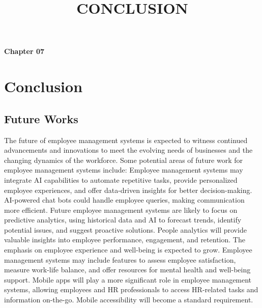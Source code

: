 \title{CONCLUSION}
\begin{center}
    \textbf{Chapter 07}\\
   \section{ \large \textbf{Conclusion}}
\end{center}
\vspace{2.5mm}
\subsection{Future Works}
The future of employee management systems is expected to witness continued
advancements and innovations to meet the evolving needs of businesses and the changing
dynamics of the workforce. Some potential areas of future work for employee management
systems include: Employee management systems may integrate AI capabilities to automate
repetitive tasks, provide personalized employee experiences, and offer data-driven insights
for better decision-making. AI-powered chat bots could handle employee queries, making
communication more efficient. Future employee management systems are likely to focus on
predictive analytics, using historical data and AI to forecast trends, identify potential issues,
and suggest proactive solutions. People analytics will provide valuable insights into
employee performance, engagement, and retention. The emphasis on employee experience
and well-being is expected to grow. Employee management systems may include features to
assess employee satisfaction, measure work-life balance, and offer resources for mental
health and well-being support. Mobile apps will play a more significant role in employee
management systems, allowing employees and HR professionals to access HR-related tasks
and information on-the-go. Mobile accessibility will become a standard requirement.
